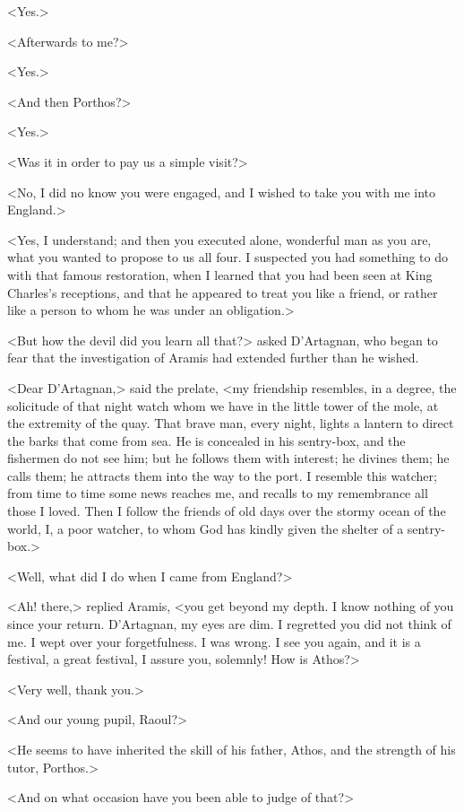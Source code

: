 <Yes.>

<Afterwards to me?>

<Yes.>

<And then Porthos?>

<Yes.>

<Was it in order to pay us a simple visit?>

<No, I did no know you were engaged, and I wished to take you with me into England.>

<Yes, I understand; and then you executed alone, wonderful man as you are, what you wanted to propose to us all four. I suspected you had something to do with that famous restoration, when I learned that you had been seen at King Charles's receptions, and that he appeared to treat you like a friend, or rather like a person to whom he was under an obligation.>

<But how the devil did you learn all that?> asked D'Artagnan, who began to fear that the investigation of Aramis had extended further than he wished.

<Dear D'Artagnan,> said the prelate, <my friendship resembles, in a degree, the solicitude of that night watch whom we have in the little tower of the mole, at the extremity of the quay. That brave man, every night, lights a lantern to direct the barks that come from sea. He is concealed in his sentry-box, and the fishermen do not see him; but he follows them with interest; he divines them; he calls them; he attracts them into the way to the port. I resemble this watcher; from time to time some news reaches me, and recalls to my remembrance all those I loved. Then I follow the friends of old days over the stormy ocean of the world, I, a poor watcher, to whom God has kindly given the shelter of a sentry-box.>

<Well, what did I do when I came from England?>

<Ah! there,> replied Aramis, <you get beyond my depth. I know nothing of you since your return. D'Artagnan, my eyes are dim. I regretted you did not think of me. I wept over your forgetfulness. I was wrong. I see you again, and it is a festival, a great festival, I assure you, solemnly! How is Athos?>

<Very well, thank you.>

<And our young pupil, Raoul?>

<He seems to have inherited the skill of his father, Athos, and the strength of his tutor, Porthos.>

<And on what occasion have you been able to judge of that?>

